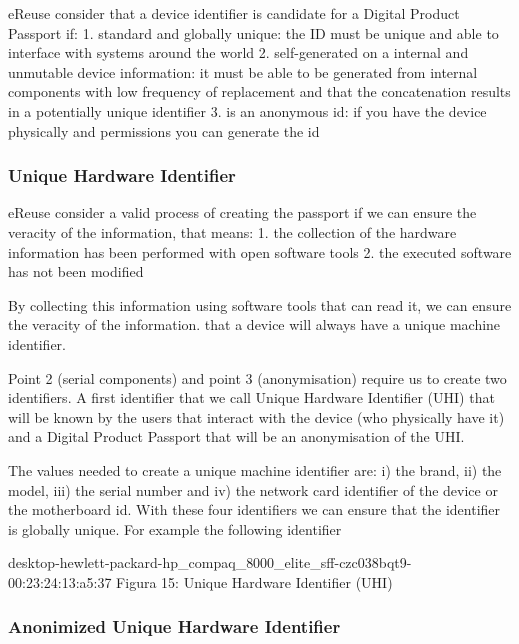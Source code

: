 \documentclass[
]{book}
\begin{document}
eReuse consider that a device identifier is candidate for a Digital Product Passport if: 1. standard and globally unique: the ID must be unique and able to interface with systems around the world 2. self-generated on a internal and unmutable device information: it must be able to be generated from internal components with low frequency of replacement and that the concatenation results in a potentially unique identifier 3. is an anonymous id: if you have the device physically and permissions you can generate the id

\hypertarget{unique-hardware-identifier}{%
\subsubsection{Unique Hardware Identifier}\label{unique-hardware-identifier}}

eReuse consider a valid process of creating the passport if we can ensure the veracity of the information, that means: 1. the collection of the hardware information has been performed with open software tools 2. the executed software has not been modified

By collecting this information using software tools that can read it, we can ensure the veracity of the information. that a device will always have a unique machine identifier.

Point 2 (serial components) and point 3 (anonymisation) require us to create two identifiers. A first identifier that we call Unique Hardware Identifier (UHI) that will be known by the users that interact with the device (who physically have it) and a Digital Product Passport that will be an anonymisation of the UHI.

The values needed to create a unique machine identifier are: i) the brand, ii) the model, iii) the serial number and iv) the network card identifier of the device or the motherboard id. With these four identifiers we can ensure that the identifier is globally unique. For example the following identifier

desktop-hewlett-packard-hp\_compaq\_8000\_elite\_sff-czc038bqt9-00:23:24:13:a5:37 Figura 15: Unique Hardware Identifier (UHI)

\hypertarget{anonimized-unique-hardware-identifier}{%
\subsubsection{Anonimized Unique Hardware Identifier}\label{anonimized-unique-hardware-identifier}}
\end{document}

